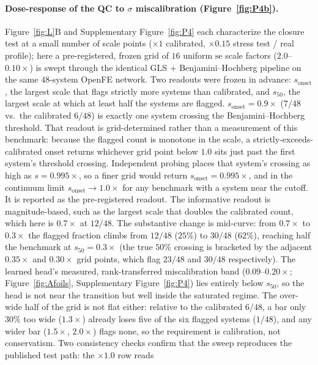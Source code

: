 \paragraph{Dose-response of the QC to $\sigma$ miscalibration (Figure~\ref{fig:P4b}).}
Figure~\ref{fig:L}B and Supplementary Figure~\ref{fig:P4} each characterize the closure test
at a small number of scale points (${\times}1$ calibrated, ${\times}0.15$ stress test / real
profile); here a pre-registered, frozen grid of $16$ uniform $\mathrm{se}$ scale factors
($2.0$--$0.10\times$) is swept through the identical GLS $+$ Benjamini--Hochberg pipeline on the
same $48$-system OpenFE network. Two readouts were frozen in advance: $s_{\text{onset}}$, the
largest scale that flags strictly more systems than calibrated, and $s_{50}$, the largest scale at
which at least half the systems are flagged. $s_{\text{onset}}=0.9\times$ ($7/48$ vs.\ the calibrated $6/48$) is exactly
one system crossing the Benjamini--Hochberg threshold. That readout is grid-determined rather than
a measurement of this benchmark: because the flagged count is monotone in the scale, a
strictly-exceeds-calibrated onset returns whichever grid point below $1.0$ sits just past the first
system's threshold crossing. Independent probing places that system's crossing as high as
$s=0.995\times$, so a finer grid would return $s_{\text{onset}}=0.995\times$, and in the continuum
limit $s_{\text{onset}}\to1.0\times$ for any benchmark with a system near the cutoff. It is
reported as the pre-registered readout. The informative readout is magnitude-based, such as the
largest scale that doubles the calibrated count, which here is $0.7\times$ at $12/48$. The
substantive change is mid-curve: from $0.7\times$ to $0.3\times$ the flagged fraction climbs from $12/48$
($25\%$) to $30/48$ ($62\%$), reaching half the benchmark at $s_{50}=0.3\times$ (the true $50\%$
crossing is bracketed by the adjacent $0.35\times$ and $0.30\times$ grid points, which flag
$23/48$ and $30/48$ respectively). The learned head's measured, rank-transferred miscalibration
band ($0.09$--$0.20\times$; Figure~\ref{fig:Afoils}, Supplementary Figure~\ref{fig:P4}) lies entirely
below $s_{50}$, so the head is not near the transition but well inside the saturated regime. The
over-wide half of the grid is not flat either: relative to the calibrated $6/48$, a bar
only $30\%$ too wide ($1.3\times$) already loses five of the six flagged systems ($1/48$), and any
wider bar ($1.5\times$, $2.0\times$) flags none, so the requirement is calibration, not
conservatism. Two consistency
checks confirm that the sweep reproduces the published test path: the ${\times}1.0$ row reads
